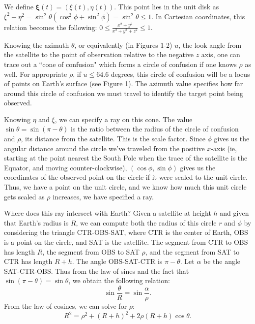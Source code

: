 \documentclass{article}
\begin{document}
We define $\bm{\xi}(t) = (\xi(t), \eta(t)).$ This point lies in the unit disk as $\xi^2 + \eta^2 = \sin^2 \theta (\cos^2 \phi + \sin^2 \phi) = \sin^2 \theta \leq 1.$ In Cartesian coordinates, this relation becomes the following: $0 \leq \frac{x^2+y^2}{x^2+y^2+z^2} \leq 1$.

Knowing the azimuth $\theta$, or equivalently (in Figures 1-2) $u$, the look angle from the satellite to the point of observation relative to the negative $z$ axis, one can trace out a ``cone of confusion" which forms a circle of confusion if one knows $\rho$ as well. For appropriate $\rho$, if $u \leq 64.6$ degrees, this circle of confusion will be a locus of points on Earth's surface (see Figure 1). The azimuth value specifies how far around this circle of confusion we must travel to identify the target point being observed.

Knowing $\eta$ and $\xi$, we can specify a ray on this cone. The value $\sin \theta = \sin (\pi - \theta)$ is the ratio between the radius of the circle of confusion and $\rho$, its distance from the satellite. This is the scale factor. Since $\phi$ gives us the angular distance around the circle we've traveled from the positive $x$-axis (ie, starting at the point nearest the South Pole when the trace of the satellite is the Equator, and moving counter-clockwise), $(\cos \phi, \sin \phi)$ gives us the coordinates of the observed point on the circle if it were scaled to the unit circle. Thus, we have a point on the unit circle, and we know how much this unit circle gets scaled as $\rho$ increases, we have specified a ray. 

Where does this ray intersect with Earth? Given a satellite at height $h$ and given that Earth's radius is $R$, we can compute both the radius of this circle $r$ and $\phi$ by considering the triangle CTR-OBS-SAT, where CTR is the center of Earth, OBS is a point on the circle, and SAT is the satellite. The segment from CTR to OBS has length $R$, the segment from OBS to SAT $\rho$, and the segment from SAT to CTR has length $R+h$. The angle OBS-SAT-CTR is $\pi - \theta$. Let $\alpha$ be the angle SAT-CTR-OBS. Thus from the law of sines and the fact that $\sin (\pi - \theta) = \sin \theta$, we obtain the following relation:
\begin{equation}
    \sin \frac{\theta}{R} = \sin \frac{\alpha}{\rho} \label{lawofsines}.
\end{equation} 
From the law of cosines, we can solve for $\rho$: 
\begin{equation}
    R^2 = \rho^2 + (R+h)^2 + 2 \rho (R+h)\cos \theta \label{lawofcosines}.
\end{equation}
\end{document}
